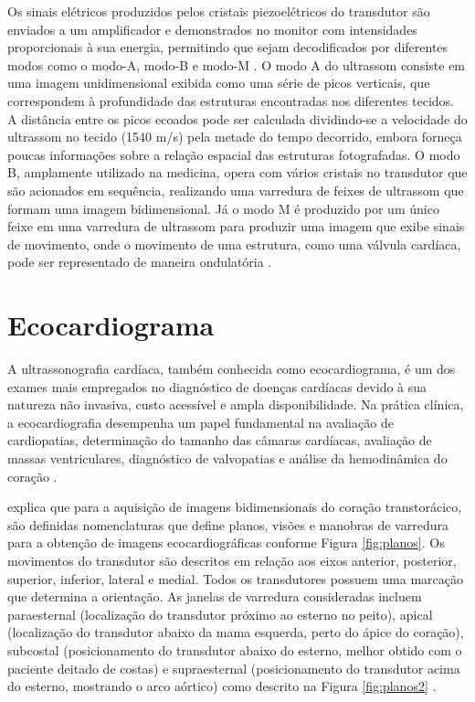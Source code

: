 Os sinais elétricos produzidos pelos cristais piezoelétricos do transdutor são enviados a um amplificador e demonstrados no monitor com intensidades proporcionais à sua energia, permitindo que sejam decodificados por diferentes modos como o modo-A, modo-B e modo-M . O modo A do ultrassom consiste em uma imagem unidimensional exibida como uma série de picos verticais, que correspondem à profundidade das estruturas encontradas nos diferentes tecidos. A distância entre os picos ecoados pode ser calculada dividindo-se a velocidade do ultrassom no tecido (1540 m/s) pela metade do tempo decorrido, embora forneça poucas informações sobre a relação espacial das estruturas fotografadas. O modo B, amplamente utilizado na medicina, opera com vários cristais no transdutor que são acionados em sequência, realizando uma varredura de feixes de ultrassom que formam uma imagem bidimensional. Já o modo M é produzido por um único feixe em uma varredura de ultrassom para produzir uma imagem que exibe sinais de movimento, onde o movimento de uma estrutura, como uma válvula cardíaca, pode ser representado de maneira ondulatória \cite{ufersa}.

\section{Ecocardiograma}
\label{sec:Ecocardiograma}

A ultrassonografia cardíaca, também conhecida como ecocardiograma, é um dos exames mais empregados no diagnóstico de doenças cardíacas devido à sua natureza não invasiva, custo acessível e ampla disponibilidade. Na prática clínica, a ecocardiografia desempenha um papel fundamental na avaliação de cardiopatias, determinação do tamanho das câmaras cardíacas, avaliação de massas ventriculares, diagnóstico de valvopatias e análise da hemodinâmica do coração \cite{8520425232}.

\textcite{Mitchell2019-br} explica que para a aquisição de imagens bidimensionais do coração transtorácico, são definidas nomenclaturas que define planos, visões e manobras de varredura para a obtenção de imagens ecocardiográficas conforme Figura \ref{fig:planos}. Os movimentos do transdutor são descritos em relação aos eixos anterior, posterior, superior, inferior, lateral e medial. Todos os transdutores possuem uma marcação que determina a orientação. As janelas de varredura consideradas incluem paraesternal (localização do transdutor próximo ao esterno no peito), apical (localização do transdutor abaixo da mama esquerda, perto do ápice do coração), subcostal (posicionamento do transdutor abaixo do esterno, melhor obtido com o paciente deitado de costas) e supraesternal (posicionamento do transdutor acima do esterno, mostrando o arco aórtico) como descrito na Figura \ref{fig:planos2} . 

